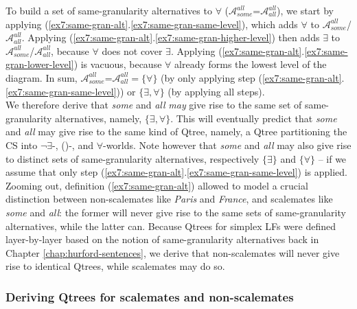 To build a set of same-granularity alternatives to $\forall$ ($\mathcal{A}_{\textit{some}}^{\textit{all}}$=$\mathcal{A}_{\textit{all}}^{\textit{all}}$), we start by applying (\ref{ex7:same-gran-alt}.\ref{ex7:same-gran-same-level}), which adds $\forall$ to $\mathcal{A}_{\textit{some}}^{\textit{all}}$/$\mathcal{A}_{\textit{all}}^{\textit{all}}$. Applying (\ref{ex7:same-gran-alt}.\ref{ex7:same-gran-higher-level}) then adds $\exists$ to $\mathcal{A}_{\textit{some}}^{\textit{all}}$/$\mathcal{A}_{\textit{all}}^{\textit{all}}$, because $\forall$ does not cover $\exists$. Applying (\ref{ex7:same-gran-alt}.\ref{ex7:same-gran-lower-level}) is vacuous, because $\forall$ already forms the lowest level of the diagram. In sum, $\mathcal{A}_{\textit{some}}^{\textit{all}}$=$\mathcal{A}_{\textit{all}}^{\textit{all}} = \lbrace\forall\rbrace$ (by only applying step (\ref{ex7:same-gran-alt}.\ref{ex7:same-gran-same-level})) or $\lbrace\exists, \forall\rbrace$ (by applying all steps).\\


We therefore derive that \textit{some} and \textit{all} \textit{may} give rise to the same set of same-granularity alternatives, namely, $\lbrace \exists, \forall\rbrace$. This will eventually predict that \textit{some} and \textit{all} may give rise to the same kind of Qtree, namely, a Qtree partitioning the CS into $\neg\exists$-, (\sbna)-, and $\forall$-worlds. Note however that \textit{some} and \textit{all} may also give rise to distinct sets of same-granularity alternatives, respectively $\lbrace \exists\rbrace$ and $\lbrace\forall\rbrace$ -- if we assume that only step (\ref{ex7:same-gran-alt}.\ref{ex7:same-gran-same-level}) is applied. Zooming out, definition (\ref{ex7:same-gran-alt}) allowed to model a crucial distinction between non-scalemates like \textit{Paris} and \textit{France}, and scalemates like \textit{some} and \textit{all}: the former will never give rise to the same sets of same-granularity alternatives, while the latter can. Because Qtrees for simplex LFs were defined layer-by-layer based on the notion of same-granularity alternatives back in Chapter \ref{chap:hurford-sentences}, we derive that non-scalemates will never give rise to identical Qtrees, while scalemates may do so.

\subsubsection{Deriving Qtrees for scalemates and non-scalemates}\label{sec:qtrees-scalemates-non-scalemates}

